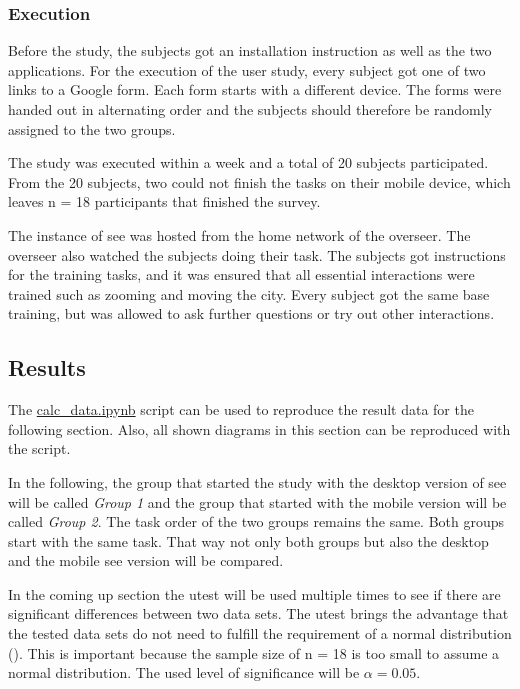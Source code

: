 \subsubsection{Execution}
Before the study, the subjects got an installation instruction as well as the two applications.
For the execution of the user study, every subject got one of two links to a Google form.
Each form starts with a different device. 
The forms were handed out in alternating order and the subjects should therefore be randomly assigned to the two groups.

The study was executed within a week and a total of 20 subjects participated.
From the 20 subjects, two could not finish the tasks on their mobile device, which leaves n = 18 participants that finished the survey.

The instance of \gls{see} was hosted from the home network of the overseer. 
The overseer also watched the subjects doing their task.
The subjects got instructions for the training tasks, and it was ensured that all essential interactions were trained such as zooming and moving the \gls{city}.
Every subject got the same base training, but was allowed to ask further questions or try out other interactions.


\subsection{Results}
The \hyperref[calc]{calc\_data.ipynb} script can be used to reproduce the result data for the following section.
Also, all shown diagrams in this section can be reproduced with the script.

In the following, the group that started the study with the desktop version of \gls{see} will be called \textit{Group 1} and the group that started with the mobile version will be called \textit{Group 2}.
The task order of the two groups remains the same.
Both groups start with the same task.
That way not only both groups but also the desktop and the mobile \gls{see} version will be compared. 

In the coming up section the \gls{utest} will be used multiple times to see if there are significant differences between two data sets.
The \gls{utest} brings the advantage that the tested data sets do not need to fulfill the requirement of a normal distribution (\cite{gibbons1991comparisons}).
This is important because the sample size of n = 18 is too small to assume a normal distribution.
The used level of significance will be $\alpha = 0.05$.

